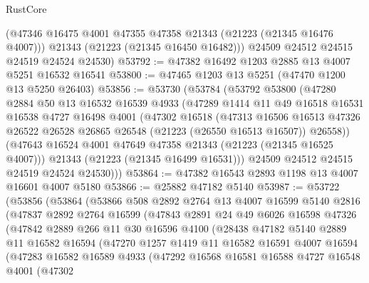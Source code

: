 \begin{lexlean}{RustCore}
\begin{coremodule}
        (@47346 @16475 @4001 @47355 @47358 @21343 (@21223 (@21345 @16476 @4007)))
        @21343
        (@21223 (@21345 @16450 @16482)))
      @24509
      @24512
      @24515
      @24519
      @24524
      @24530)
@53792 := @47382 @16492 @1203 @2885 @13 @4007 @5251 @16532 @16541
@53800 := @47465 @1203 @13 @5251 (@47470 @1200 @13 @5250 @26403)
@53856 := @53730
    (@53784
      (@53792
        @53800
        (@47280
          @2884
          @50
          @13
          @16532
          @16539
          @4933
          (@47289
            @1414
            @11
            @49
            @16518
            @16531
            @16538
            @4727
            @16498
            @4001
            (@47302
              @16518
              (@47313
                @16506
                @16513
                @47326
                @26522
                @26528
                @26865
                @26548
                (@21223 (@26550 @16513 @16507))
                @26558))
            (@47643 @16524 @4001 @47649 @47358 @21343 (@21223 (@21345 @16525 @4007)))
            @21343
            (@21223 (@21345 @16499 @16531)))
          @24509
          @24512
          @24515
          @24519
          @24524
          @24530)))
@53864 := @47382 @16543 @2893 @1198 @13 @4007 @16601 @4007 @5180
@53866 := @25882 @47182 @5140
@53987 := @53722
    (@53856
      (@53864
        (@53866
          @508
          @2892
          @2764
          @13
          @4007
          @16599
          @5140
          @2816
          (@47837
            @2892
            @2764
            @16599
            (@47843
              @2891
              @24
              @49
              @6026
              @16598
              @47326
              (@47842
                @2889
                @266
                @11
                @30
                @16596
                @4100
                (@28438
                  @47182
                  @5140
                  @2889
                  @11
                  @16582
                  @16594
                  (@47270
                    @1257
                    @1419
                    @11
                    @16582
                    @16591
                    @4007
                    @16594
                    (@47283
                      @16582
                      @16589
                      @4933
                      (@47292
                        @16568
                        @16581
                        @16588
                        @4727
                        @16548
                        @4001
                        (@47302

\end{coremodule}
\end{lexlean}

